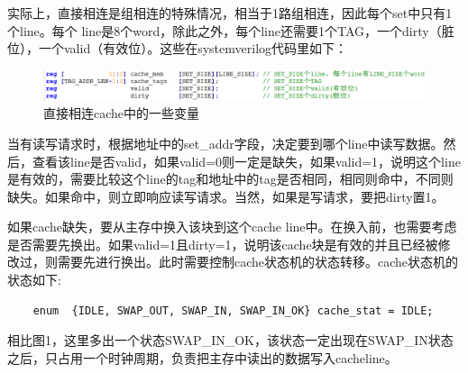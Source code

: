 \documentclass{ctexart}
\begin{document}
\par 实际上，直接相连是组相连的特殊情况，相当于1路组相连，因此每个set中只有1个line。每个 line是8个word，除此之外，每个line还需要1个TAG，一个dirty（脏位），一个valid（有效位）。这些在system\space verilog代码里如下：
\par \begin{figure}[H]
    \centering
    \includegraphics[scale=0.65]{zjxlbl.png}
    \caption{直接相连cache中的一些变量}
\end{figure}
\par 当有读写请求时，根据地址中的set\_addr字段，决定要到哪个line中读写数据。然后，查看该line是否valid，如果valid=0则一定是缺失，如果valid=1，说明这个line是有效的，需要比较这个line的tag和地址中的tag是否相同，相同则命中，不同则缺失。如果命中，则立即响应读写请求。当然，如果是写请求，要把dirty置1。
\par 如果cache缺失，要从主存中换入该块到这个cache line中。在换入前，也需要考虑是否需要先换出。如果valid=1且dirty=1，说明该cache块是有效的并且已经被修改过，则需要先进行换出。此时需要控制cache状态机的状态转移。cache状态机的状态如下:
\begin{lstlisting}
    enum  {IDLE, SWAP_OUT, SWAP_IN, SWAP_IN_OK} cache_stat = IDLE;
    \end{lstlisting}
\par 相比图1，这里多出一个状态SWAP\_IN\_OK，该状态一定出现在SWAP\_IN状态之后，只占用一个时钟周期，负责把主存中读出的数据写入cache\space line。
\end{document}
